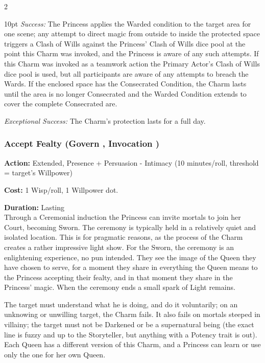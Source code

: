 \begin{multicols}{2}
\begin{myindentpar}{10pt}
    \emph{Success:} The Princess applies the Warded condition to the target area for one scene; any attempt to direct magic from outside to inside the protected space triggers a Clash of Wills against the Princess' Clash of Wills dice pool at the point this Charm was invoked, and the Princess is aware of any such attempts. If this Charm was invoked as a teamwork action the Primary Actor's Clash of Wills dice pool is used, but all participants are aware of any attempts to breach the Wards. If the enclosed space has the Consecrated Condition, the Charm lasts until the area is no longer Consecrated and the Warded Condition extends to cover the complete Consecrated are.

    \emph{Exceptional Success:} The Charm's protection lasts for a full day.\end{myindentpar}


\subsubsection*{Accept Fealty (Govern \textbullet\textbullet, Invocation \textbullet\textbullet\textbullet)}

\noindent \textbf{Action:} Extended, Presence + Persuasion - Intimacy (10 minutes/roll, threshold = target's Willpower)

\noindent \textbf{Cost:} 1 Wisp/roll, 1 Willpower dot.

\noindent \textbf{Duration:} Lasting \\

\noindent Through a Ceremonial induction the Princess can invite mortals to join her Court, becoming Sworn. The ceremony is typically held in a relatively quiet and isolated location. This is for pragmatic reasons, as the process of the Charm creates a rather impressive light show. For the Sworn, the ceremony is an enlightening experience, no pun intended. They see the image of the Queen they have chosen to serve, for a moment they share in everything the Queen means to the Princess accepting their fealty, and in that moment they share in the Princess' magic. When the ceremony ends a small spark of Light remains.

The target must understand what he is doing, and do it voluntarily; on an unknowing or unwilling target, the Charm fails. It also fails on mortals steeped in villainy; the target must not be Darkened or be a supernatural being (the exact line is fuzzy and up to the Storyteller, but anything with a Potency trait is out). Each Queen has a different version of this Charm, and a Princess can learn or use only the one for her own Queen.


\end{multicols}
